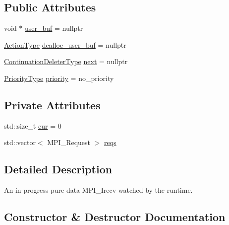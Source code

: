 \subsection*{Public Attributes}
\begin{DoxyCompactItemize}
\item 
void $\ast$ \hyperlink{structvt_1_1messaging_1_1_in_progress_data_i_recv_abe6d7de2eeb0aaa8bd453a7cb24969a8}{user\+\_\+buf} = nullptr
\item 
\hyperlink{namespacevt_ae0a5a7b18cc99d7b732cb4d44f46b0f3}{Action\+Type} \hyperlink{structvt_1_1messaging_1_1_in_progress_data_i_recv_ad1cd80fe79577e1a22177ad1f49f8c0d}{dealloc\+\_\+user\+\_\+buf} = nullptr
\item 
\hyperlink{namespacevt_a6de3bd201e2a040be9362d9d24d1e446}{Continuation\+Deleter\+Type} \hyperlink{structvt_1_1messaging_1_1_in_progress_data_i_recv_a0f080a57da0a21402687c3a96d535036}{next} = nullptr
\item 
\hyperlink{namespacevt_a86bff9f556eb761b27fc8600d006ac04}{Priority\+Type} \hyperlink{structvt_1_1messaging_1_1_in_progress_data_i_recv_a4ba8a7812367449cfe568d87806fd4c4}{priority} = no\+\_\+priority
\end{DoxyCompactItemize}
\subsection*{Private Attributes}
\begin{DoxyCompactItemize}
\item 
std\+::size\+\_\+t \hyperlink{structvt_1_1messaging_1_1_in_progress_data_i_recv_a74c8704c86b2be19c06a0b7152aede88}{cur} = 0
\item 
std\+::vector$<$ M\+P\+I\+\_\+\+Request $>$ \hyperlink{structvt_1_1messaging_1_1_in_progress_data_i_recv_a077c3734a7c030be8e230406af350781}{reqs}
\end{DoxyCompactItemize}


\subsection{Detailed Description}
An in-\/progress pure data M\+P\+I\+\_\+\+Irecv watched by the runtime. 

\subsection{Constructor \& Destructor Documentation}
\mbox{\label{structvt_1_1messaging_1_1_in_progress_data_i_recv_af2bf74787f28b863c0dfc355d176d819}} 
